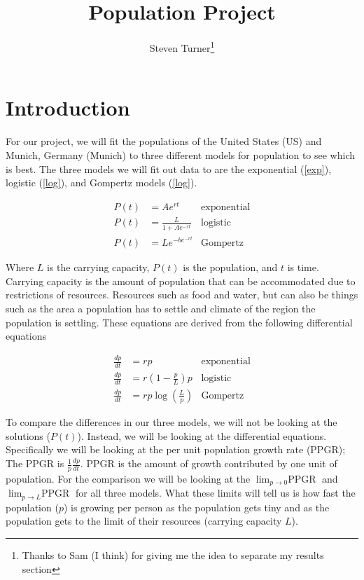 \documentclass[english]{article}
\newcommand{\pop}{population }
\begin{document}
\title{Population Project}

\author{
	Steven Turner\thanks{Thanks to Sam (I think) for giving me the idea to separate my results section}
}
\maketitle
\tableofcontents

%


\section{Introduction}

For our project, we will fit the populations of the United States (US) and Munich, Germany (Munich) to three different models for \pop to see which is best. The three models we will fit out data to are the exponential (\ref{exp}), logistic (\ref{log}), and Gompertz models (\ref{log}).

\begin{align}
\label{exp}P(t)&=Ae^{rt} & \text{exponential}\\
\label{log}P(t)&=\frac{L}{1+Ae^{-rt}}&\text{logistic}\\
\label{gom}P(t)&=Le^{-be^{-rt}}&\text{Gompertz}
\end{align}

Where $ L $ is the carrying capacity, $ P(t) $ is the population, and $ t $ is time. Carrying capacity is the amount of \pop that can be accommodated due to restrictions of resources. Resources such as food and water, but can also be things such as the area a \pop has to settle and climate of the region the \pop is settling.
These equations are derived from the following differential equations

\begin{align}
\frac{dp}{dt}&=rp &\text{exponential}\\
\frac{dp}{dt}&=r(1-\frac{p}{L})p &\text{logistic}\\
\frac{dp}{dt}&=rp\log\left(\frac{L}{p}\right)&\text{Gompertz}
\end{align}

To compare the differences in our three models, we will not be looking at the solutions ($ P(t) $). Instead, we will be looking at the differential equations. Specifically we will be looking at the per unit population growth rate (PPGR); The PPGR is $ \frac{1}{p}\frac{dp}{dt} $. PPGR is the amount of growth contributed by one unit of population. For the comparison we will be looking at the $ \displaystyle\lim_{p\rightarrow0}\text{PPGR} $ and $ \displaystyle\lim_{p\rightarrow L}\text{PPGR} $ for all three models. What these limits will tell us is how fast the population ($ p $) is growing per person as the population gets tiny and as the population gets to the limit of their resources (carrying capacity $ L $).\\
\end{document}
